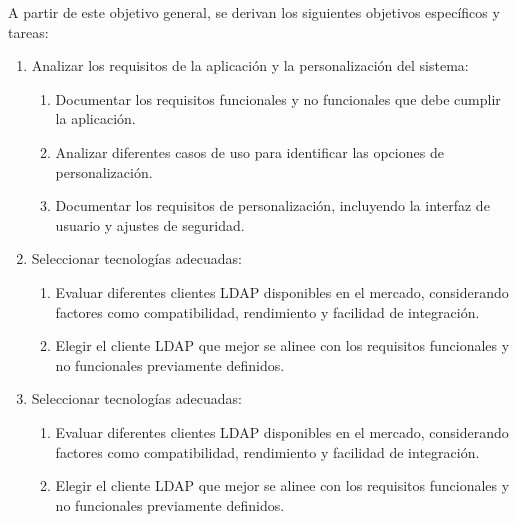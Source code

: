
A partir de este objetivo general, se derivan los siguientes objetivos específicos y tareas:

\begin{enumerate}[label=\arabic*., itemindent=*, leftmargin=*]

    \item Analizar los requisitos de la aplicación y la personalización del sistema:
          \begin{enumerate}[label=\arabic{enumi}.\arabic*., leftmargin=*]
              \item Documentar los requisitos funcionales y no funcionales que debe cumplir la aplicación.
              \item Analizar diferentes casos de uso para identificar las opciones de personalización.
              \item Documentar los requisitos de personalización, incluyendo la interfaz de usuario y ajustes de seguridad.
          \end{enumerate}

    \item Seleccionar tecnologías adecuadas:
          \begin{enumerate}[label=\arabic{enumi}.\arabic*., leftmargin=*]
              \item Evaluar diferentes clientes LDAP disponibles en el mercado, considerando factores como compatibilidad, rendimiento y facilidad de integración.
              \item Elegir el cliente LDAP que mejor se alinee con los requisitos funcionales y no funcionales previamente definidos.
          \end{enumerate}

    \item Seleccionar tecnologías adecuadas:
          \begin{enumerate}[label=\arabic{enumi}.\arabic*., leftmargin=*]
              \item Evaluar diferentes clientes LDAP disponibles en el mercado, considerando factores como compatibilidad, rendimiento y facilidad de integración.
              \item Elegir el cliente LDAP que mejor se alinee con los requisitos funcionales y no funcionales previamente definidos.
          \end{enumerate}


\end{enumerate}

